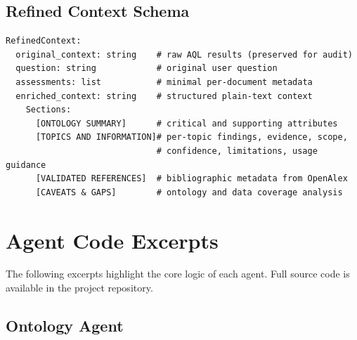 \section{Refined Context Schema}\label{app:schema-context}

\begin{lstlisting}[style=promptstyle,
caption={Structure of the \texttt{RefinedContext} object produced by
the Refinement Agent and consumed by the Generation Agent.},
label={lst:schema-context}]
RefinedContext:
  original_context: string    # raw AQL results (preserved for audit)
  question: string            # original user question
  assessments: list           # minimal per-document metadata
  enriched_context: string    # structured plain-text context
    Sections:
      [ONTOLOGY SUMMARY]      # critical and supporting attributes
      [TOPICS AND INFORMATION]# per-topic findings, evidence, scope,
                              # confidence, limitations, usage guidance
      [VALIDATED REFERENCES]  # bibliographic metadata from OpenAlex
      [CAVEATS & GAPS]        # ontology and data coverage analysis
\end{lstlisting}

\chapter{Agent Code Excerpts}\label{app:code}

The following excerpts highlight the core logic of each agent.
Full source code is available in the project repository.

\section{Ontology Agent}\label{app:code-ontology}

